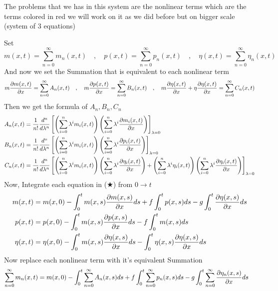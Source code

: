 \begin{example}
    \par
    The problems that we has in this system are the nonlinear terms which are the terms colored in red
    we will work on it as we did before but on bigger scale (system of 3 equations)
    \par
    Set
    \[
        m(x,t) = \sum_{n=0}^{\infty} m_n(x,t)
        \quad , \quad
        p(x,t) = \sum_{n=0}^{\infty} p_n(x,t)
        \quad , \quad
        \eta(x,t) = \sum_{n=0}^{\infty} \eta_n(x,t)
    \]
    And now we set the Summation that is equivalent to each nonlinear term
    \[
        m\pdv{m(x,t)}{x} = \sum_{n=0}^{\infty} A_n(x,t)
        \quad , \quad
        m\pdv{p(x,t)}{x} = \sum_{n=0}^{\infty} B_n(x,t)
        \quad , \quad
        m \pdv{\eta(x,t)}{x} + \eta\pdv{\eta(x,t)}{x} = \sum_{n=0}^{\infty} C_n(x,t)
    \]
    Then we get the formula of $A_n , B_n , C_n$
    \begin{align*}
        A_n(x,t) & = \frac{1}{n!} \frac{d^n}{d\lambda^n} \left[\left(\sum_{i=0}^{n}  \lambda^i m_i(x,t)\right)\left(\sum_{i=0}^{n}  \lambda^i \pdv{m_i(x,t)}{x}\right)\right]_{\lambda = 0}
        \\
        B_n(x,t) & = \frac{1}{n!} \frac{d^n}{d\lambda^n} \left[\left(\sum_{i=0}^{n}  \lambda^i m_i(x,t)\right)\left(\sum_{i=0}^{n}  \lambda^i \pdv{p_i(x,t)}{x}\right)\right]_{\lambda = 0}
        \\
        C_n(x,t) & = \frac{1}{n!} \frac{d^n}{d\lambda^n} \left[\left(\sum_{i=0}^{n}  \lambda^i m_i(x,t)\right)\left(\sum_{i=0}^{n}  \lambda^i \pdv{\eta_i(x,t)}{x}\right) + \left(\sum_{i=0}^{n}  \lambda^i \eta_i(x,t)\right)\left(\sum_{i=0}^{n}  \lambda^i \pdv{\eta_i(x,t)}{x}\right)\right]_{\lambda = 0}
    \end{align*}
    Now, Integrate each equation in ($\bigstar$) from $0 \to t $
    \begin{align*}
        m(x,t)    & = m(x,0) - \int_{0}^{t}m(x,s) \pdv{m(x,s)}{x} ds + f\int_{0}^{t} p(x,s)ds - g\int_{0}^{t}\pdv{\eta(x,s)}{x} ds
        \\
        p(x,t)    & = p(x,0) - \int_{0}^{t} m(x,s) \pdv{p(x,s)}{x} ds - f\int_{0}^{t} m(x,s)ds
        \\
        \eta(x,t) & = \eta(x,0) - \int_{0}^{t} m(x,s) \pdv{\eta(x,s)}{x} ds - \int_{0}^{t} \eta(x,s)\pdv{\eta(x,s)}{x} ds
    \end{align*}
    Now replace each nonlinear term with it's equivalent Summation
    \begin{align*}
        \sum_{n=0}^{\infty} m_n(x,t)    & = m(x,0) - \int_{0}^{t}\sum_{n=0}^{\infty} A_n(x,s)  ds + f\int_{0}^{t} \sum_{n=0}^{\infty} p_n(x,s) ds - g\int_{0}^{t}\sum_{n=0}^{\infty} \pdv{\eta_n(x,s)}{x} ds

\end{align*}
\end{example}
